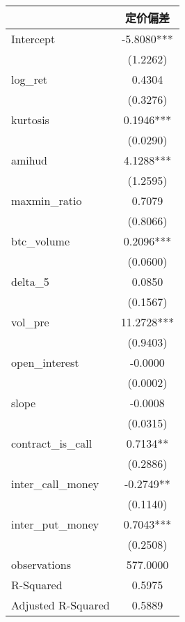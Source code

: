 \begin{tabular}{lc}
\hline
                   &    定价偏差     \\
\midrule
\midrule
Intercept          & -5.8080***  \\
                   & (1.2262)    \\
log\_ret           & 0.4304      \\
                   & (0.3276)    \\
kurtosis           & 0.1946***   \\
                   & (0.0290)    \\
amihud             & 4.1288***   \\
                   & (1.2595)    \\
maxmin\_ratio      & 0.7079      \\
                   & (0.8066)    \\
btc\_volume        & 0.2096***   \\
                   & (0.0600)    \\
delta\_5           & 0.0850      \\
                   & (0.1567)    \\
vol\_pre           & 11.2728***  \\
                   & (0.9403)    \\
open\_interest     & -0.0000     \\
                   & (0.0002)    \\
slope              & -0.0008     \\
                   & (0.0315)    \\
contract\_is\_call & 0.7134**    \\
                   & (0.2886)    \\
inter\_call\_money & -0.2749**   \\
                   & (0.1140)    \\
inter\_put\_money  & 0.7043***   \\
                   & (0.2508)    \\
observations       & 577.0000    \\
R-Squared          & 0.5975      \\
Adjusted R-Squared & 0.5889      \\
\hline
\end{tabular}